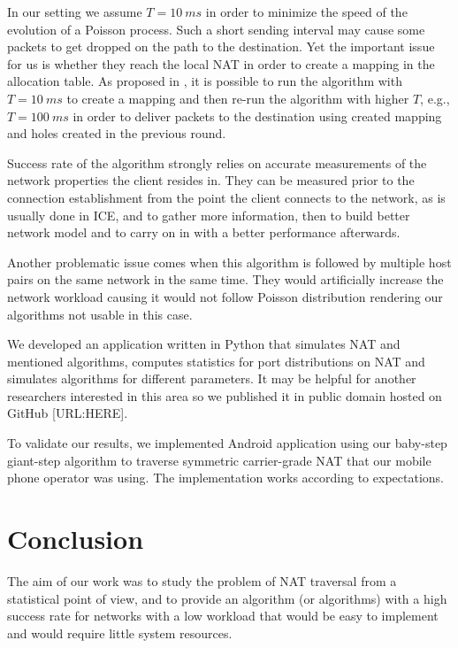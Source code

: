 \documentclass{llncs}
\begin{document}
In our setting we assume $T=10~ms$ in order to minimize the speed of the evolution of a Poisson process.
Such a short sending interval may cause some packets to get dropped on the path to the destination. Yet the 
important issue for us is whether they reach the local NAT in order to create a mapping in the allocation table. As proposed 
in \citep{Wang:2006:RSN:1156422.1156550}, it is possible to run the algorithm with $T=10~ms$ to create a mapping
and then re-run the algorithm with higher $T$, e.g., $T=100~ms$ in order to deliver packets to the destination
using created mapping and holes created in the previous round.

Success rate of the algorithm strongly relies on accurate measurements of the network 
properties the client resides in. They can be measured prior to the connection establishment 
from the point the client connects to the network, as is usually done in ICE, and to gather 
more information, then to build better network model and to carry on in with a better performance afterwards.


Another problematic issue comes when this algorithm is followed by multiple host pairs on
the same network in the same time. They would artificially increase the network workload
causing it would not follow Poisson distribution rendering our algorithms not usable in
this case.

We developed an application written in Python that simulates NAT and mentioned algorithms, computes
statistics for port distributions on NAT and simulates algorithms for different parameters. It
may be helpful for another researchers interested in this area so we published it in public domain
hosted on GitHub [URL:HERE].

To validate our results, we implemented Android application using our baby-step giant-step algorithm
to traverse symmetric carrier-grade NAT that our mobile phone operator was using. The implementation
works according to expectations.

\section{Conclusion}
The aim of our work was to study the problem of NAT traversal from a statistical point of view,
and to provide an algorithm (or algorithms) with a high success rate for networks with a low workload that would be easy to 
implement and would require little system resources.
\end{document}
